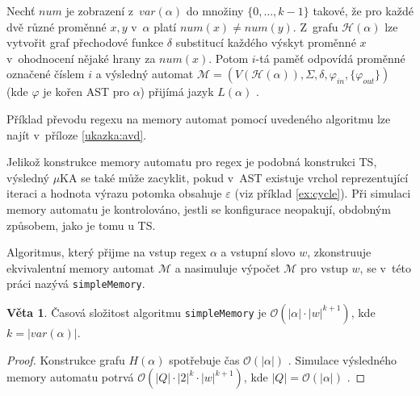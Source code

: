 \documentclass[thesis=B,czech]{FITthesis}[2019/12/23]
\theoremstyle{definition}
\newtheorem{theorem}{Věta}[chapter]
\begin{document}
Nechť $num$ je zobrazení z~$var(\alpha)$ do množiny $\{0, \dots, k-1\}$ takové, že pro každé dvě různé proměnné $x, y$ v~$\alpha$ platí $num(x) \ne num(y)$. Z~grafu $\mathcal{H}(\alpha)$ lze vytvořit graf přechodové funkce $\delta$ substitucí každého výskyt proměnné $x$ v~ohodnocení nějaké hrany za $num(x)$. Potom $i$-tá paměť odpovídá proměnné označené číslem $i$ a výsledný automat $\mathcal{M} = (V(\mathcal{H}(\alpha)), \Sigma, \delta, \varphi_{in}, \{\varphi_{out}\})$ (kde $\varphi$ je kořen AST pro $\alpha$) přijímá jazyk $L(\alpha)$ \cite[s. 5]{schmidref}.

Příklad převodu regexu na memory automat pomocí uvedeného algoritmu lze najít v~příloze \ref{ukazka:avd}.

Jelikož konstrukce memory automatu pro regex je podobná konstrukci TS, výsledný $\mu$KA se také může zacyklit, pokud v~AST existuje vrchol reprezentující iteraci a hodnota výrazu potomka obsahuje $\varepsilon$ (viz příklad \ref{ex:cycle}). Při simulaci memory automatu je kontrolováno, jestli se konfigurace neopakují, obdobným způsobem, jako je tomu u TS.  

Algoritmus, který přijme na vstup regex $\alpha$ a vstupní slovo $w$, zkonstruuje ekvivalentní memory automat $\mathcal{M}$ a nasimuluje výpočet $\mathcal{M}$ pro vstup $w$, se v~této práci nazývá \texttt{simpleMemory}.

\begin{theorem}\label{thm:simplemem}
Časová složitost algoritmu \texttt{simpleMemory} je $\mathcal{O}(|\alpha|\cdot|w|^{k+1})$, kde $k = |var(\alpha)|$.
\end{theorem}
\begin{proof} Konstrukce grafu $H(\alpha)$ spotřebuje čas $\mathcal{O}(|\alpha|)$ \cite[lemma 3]{schmidref}. Simulace výsledného memory automatu potrvá $\mathcal{O}(|Q|\cdot|2|^k\cdot|w|^{k+1})$, kde $|Q| = \mathcal{O}(|\alpha|)$ \cite[lemma~2]{schmidref}.
\end{proof}

\iffalse
\end{document}
